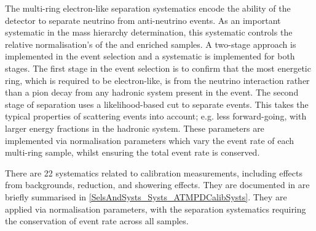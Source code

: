 The multi-ring electron-like separation systematics encode the ability of the detector to separate neutrino from anti-neutrino events. As an important systematic in the mass hierarchy determination, this systematic controls the relative normalisation's of the  and  enriched samples. A two-stage approach is implemented in the event selection and a systematic is implemented for both stages. The first stage in the event selection is to confirm that the most energetic ring, which is required to be electron-like, is from the neutrino interaction rather than a pion decay from any hadronic system present in the event. The second stage of separation uses a likelihood-based cut to separate  events. This takes the typical properties of  scattering events into account; e.g. less forward-going, with larger energy fractions in the hadronic system. These parameters are implemented via normalisation parameters which vary the event rate of each multi-ring sample, whilst ensuring the total event rate is conserved.

There are 22 systematics related to calibration measurements, including effects from backgrounds, reduction, and showering effects. They are documented in \cite{Jiang2019-iw} are briefly summarised in \autoref{SelsAndSysts_Systs_ATMPDCalibSysts}. They are applied via normalisation parameters, with the separation systematics requiring the conservation of event rate across all samples.

